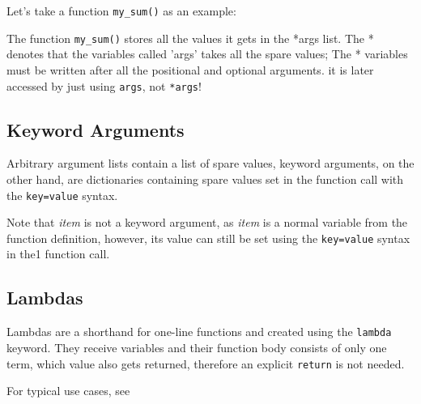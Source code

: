     Let's take a function \texttt{my_sum()} as an example:


    The function \texttt{my_sum()} stores all the values it gets in the *args list.
    The * denotes that the variables called 'args' takes all the spare values; The * variables must
    be written after all the positional and optional arguments.
    it is later accessed by just using \texttt{args}, not \texttt{*args}!
  
  \subsection{Keyword Arguments}
    Arbitrary argument lists contain a list of spare values, keyword arguments, on the other hand,
    are dictionaries containing spare values set in the function call with the
    \texttt{key=value} syntax.


    Note that \textit{item} is not a keyword argument, as \textit{item} is a normal variable
    from the function definition, however, its value can still be set using the
    \texttt{key=value} syntax in the1 function call.
    

  
  \subsection{Lambdas}
    Lambdas are a shorthand for one-line functions and created using the
    \texttt{lambda} keyword. They receive variables and their function body consists
    of only one term, which value also gets returned, therefore an explicit
    \texttt{return} is not needed.

    For typical use cases, see 

